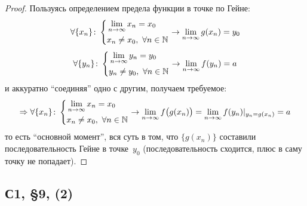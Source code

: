 \documentclass[a4paper,12pt]{article}
\begin{document}
  \begin{proof}
    Пользуясь определением предела функции в точке по Гейне:
    \[
      \forall \{x_n\}\colon \left\{
        \begin{aligned}
          &\lim_{n \to \infty} x_n = x_0\\
          &x_n \not= x_0,\ \forall n \in \mathbb N
        \end{aligned}
      \right.
      \to \lim_{n \to \infty} g(x_n) = y_0
    \]
    \[
      \forall \{y_n\}\colon \left\{
        \begin{aligned}
          &\lim_{n \to \infty} y_n = y_0\\
          &y_n \not= y_0,\ \forall n \in \mathbb N
        \end{aligned}
      \right.
      \to \lim_{n \to \infty} f(y_n) = a
    \]
    и аккуратно ``соединяя'' одно с другим, получаем требуемое:
    \[
      \Rightarrow \forall \{x_n\}\colon \left\{
        \begin{aligned}
          &\lim_{n \to \infty} x_n = x_0\\
          &x_n \not= x_0,\ \forall n \in \mathbb N
        \end{aligned}
      \right.
      \to \lim_{n \to \infty} f\bigl(g(x_n)\bigr)
        = \lim_{n \to \infty} f(y_n)|_{y_n = g(x_n)}
        = a
    \]
    то есть ``основной момент'', вся суть в том, что $\{g(x_n)\}$ составили последовательность Гейне в точке~$y_0$ (последовательность сходится, плюс в саму точку не попадает).
  \end{proof}
  

  \subsection{С1, \S 9, (2)}
\end{document}
